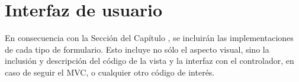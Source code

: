 \section{\forlnameref Interfaz de usuario}
\label{sec:userInterfaceImplementation}

\begin{shaded}
En consecuencia con la Sección  del Capítulo , se incluirán las implementaciones de cada tipo de formulario. Esto incluye no sólo el aspecto visual, sino la inclusión y descripción del código de la vista y la interfaz con el controlador, en caso de seguir el \ac{MVC}, o cualquier otro código de interés.
\end{shaded}